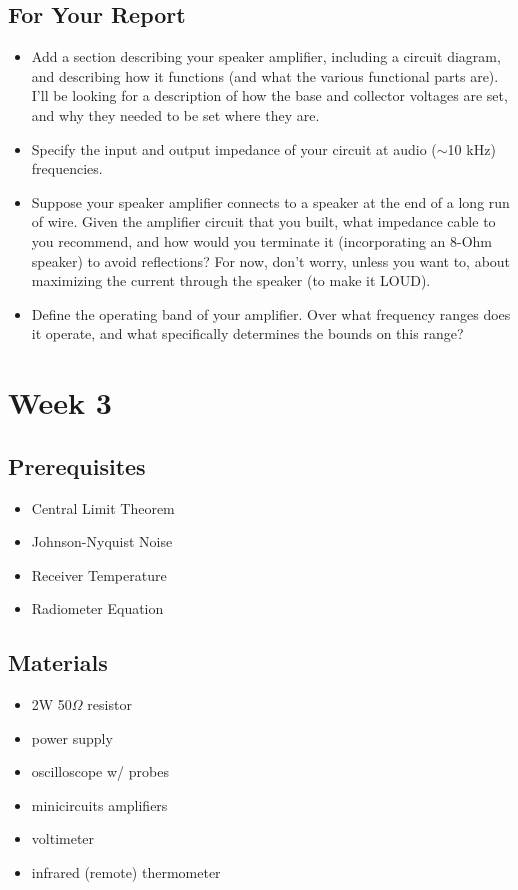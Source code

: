 \documentclass[11pt]{article}
\begin{document}
\subsection{For Your Report}
\begin{itemize}[noitemsep,nolistsep]
\item Add a section describing your speaker amplifier, including a circuit diagram, and describing
how it functions (and what the various functional parts are).  I'll be looking for a description
of how the base and collector voltages are set, and why they needed to be set where they are.
\item Specify the input and output impedance of your circuit at audio ($\sim$10 kHz) frequencies.
\item Suppose your speaker amplifier connects to a speaker at the end of a long run of wire.
Given the amplifier circuit that you built, what impedance cable to you recommend, and how would you
terminate it (incorporating an 8-Ohm speaker) to avoid reflections?  For now, don't worry, unless you want
to, about maximizing the current through the speaker (to make it LOUD).
\item Define the operating band of your amplifier.  Over what frequency ranges does it operate,
and what specifically determines the bounds on this range?
\end{itemize}

\section{Week 3}
\label{sec:week3}

\subsection*{Prerequisites}

\begin{itemize}[noitemsep,nolistsep]
\item Central Limit Theorem
\item Johnson-Nyquist Noise
\item Receiver Temperature
\item Radiometer Equation
\end{itemize}

\subsection*{Materials}

\begin{itemize}[noitemsep,nolistsep]
\item 2W 50$\Omega$ resistor
\item power supply
\item oscilloscope w/ probes
\item minicircuits amplifiers
\item voltimeter
\item infrared (remote) thermometer
\end{itemize}
\end{document}
